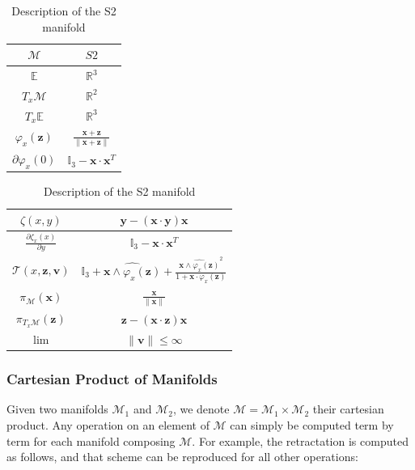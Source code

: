 \begin{table} [H]
\caption{Description of the S2 manifold}
\centering
\begin{tabular}{cc}
  \toprule
  $\mathcal{M}$ & $S2$ \\
  \midrule
  $\mathbb{E}$ & $\mathbb{R}^{3}$ \\
  \midrule
  $T_x\mathcal{M}$ & $\mathbb{R}^2$ \\
  \midrule
  $T_x\mathbb{E}$ & $\mathbb{R}^3$ \\
  \midrule
  $\varphi_x(\mathbf{z})$ & $\frac{\mathbf{x}+\mathbf{z}}{\|\mathbf{x}+\mathbf{z}\|}$ \\
  \midrule
  $\partial \varphi_x(0)$ & $\mathbb{I}_3 - \mathbf{x}\cdot\mathbf{x}^T$ \\
  \bottomrule
\end{tabular}
\quad
\begin{tabular}{cc}
  \toprule
  $\zeta(x,y)$ & $\mathbf{y} - (\mathbf{x} \cdot \mathbf{y}) \mathbf{x}$ \\
  \midrule
  $\frac{\partial \zeta_x(x)}{\partial y}$ & $\mathbb{I}_3 -\mathbf{x}\cdot\mathbf{x}^T$ \\
  \midrule
  $\mathcal{T}(x,\mathbf{z}, \mathbf{v})$ & $\mathbb{I}_3 + \widehat{\mathbf{x} \wedge \varphi_x(\mathbf{z})} + \frac{{\widehat{\mathbf{x} \wedge \varphi_x(\mathbf{z})}}^2}{1+\mathbf{x}\cdot\varphi_x(\mathbf{z})}$ \\
  \midrule
  $\pi_\mathcal{M}(\mathbf{x})$ & $\frac{\mathbf{x}}{\|\mathbf{x}\|}$ \\
  \midrule
  $\pi_{T_x\mathcal{M}}(\mathbf{z})$ & $\mathbf{z} - (\mathbf{x} \cdot \mathbf{z}) \mathbf{x}$ \\
  \midrule
  $\lim$ & $\|\mathbf{v}\| \leq \infty$ \\
  \bottomrule
\end{tabular}
\end{table}

\subsubsection{Cartesian Product of Manifolds}
\label{ssub:cartesian_product_of_manifolds}
Given two manifolds $\mathcal{M}_1$ and $\mathcal{M}_2$, we denote $\mathcal{M}=\mathcal{M}_1\times\mathcal{M}_2$ their cartesian product.
Any operation on an element of $\mathcal{M}$ can simply be computed term by term for each manifold composing $\mathcal{M}$.
For example, the retractation is computed as follows, and that scheme can be reproduced for all other operations:

